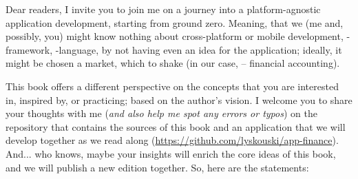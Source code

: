 
Dear readers, I invite you to join me on a journey into a platform-agnostic application development, starting from 
ground zero. Meaning, that we (me and, possibly, you) might know nothing about cross-platform or mobile development, 
-framework, -language, by not having even an idea for the application; ideally, it might 
be chosen a market, which to shake (in our case, -- financial accounting).

This book offers a different perspective on the concepts that you are interested in, inspired by, or practicing; 
based on the author's vision. I welcome you to share your thoughts with me (\emph{and also help me spot any errors 
or typos}) on the repository that contains the sources of this book and an application that we will develop together 
as we read along (\href{https://github.com/lyskouski/app-finance}{https://github.com/lyskouski/app-finance}). And... 
who knows, maybe your insights will enrich the core ideas of this book, and we will publish a new edition together. 
So, here are the statements:

